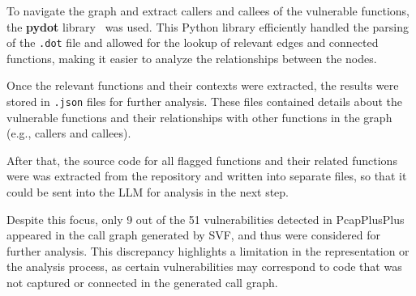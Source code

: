 To navigate the graph and extract callers and callees of the vulnerable functions, the \textbf{pydot} library~\cite{pydot} was used. This Python library efficiently handled the parsing of the \texttt{.dot} file and allowed for the lookup of relevant edges and connected functions, making it easier to analyze the relationships between the nodes.

Once the relevant functions and their contexts were extracted, the results were stored in \texttt{.json} files for further analysis. These files contained details about the vulnerable functions and their relationships with other functions in the graph (e.g., callers and callees). 

After that, the source code for all flagged functions and their related functions were was extracted from the repository and written into separate files, so that it could be sent into the LLM for analysis in the next step.

Despite this focus, only 9 out of the 51 vulnerabilities detected in PcapPlusPlus appeared in the call graph generated by SVF, and thus were considered for further analysis. This discrepancy highlights a limitation in the representation or the analysis process, as certain vulnerabilities may correspond to code that was not captured or connected in the generated call graph.
